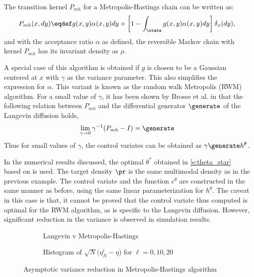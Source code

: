 The transition kernel $P_{mh}$ for a Metropolis-Hastings chain can be written as:
\begin{equation}
P_{mh}(x,dy) \eqdef g(x,y) \alpha(x,y) dy + \left [ 1 - \int_{\state} g(x,y) \alpha(x,y) dy \right] \delta_x (dy),
\label{e:kernel_mh}
\end{equation}
and with the acceptance ratio $\alpha$ as defined, the reversible Markov chain with kernel $P_{mh}$ has its invariant density as $\rho$.

A special case of this algorithm is obtained if $g$ is chosen to be a Gaussian centered at $x$ with $\gamma$ as the variance parameter. This also simplifies the expression for $\alpha$. This variant is known as the random walk Metropolis (RWM) algorithm. For a small value of $\gamma$, it has been shown by Brosse et al. in \cite{brosse} that the following relation between $P_{mh}$ and the differential generator $\generate$ of the Langevin diffusion holds,
\[
\lim_{\gamma \to 0} \gamma^{-1} (P_{mh} - I) = \generate
\]
Thus for small values of $\gamma$, the control variates can be obtained as $\gamma \generate h^\theta$.  

In the numerical results discussed, the optimal $\theta^*$ obtained in \eqref{e:theta_star} based on  is used. The target density $\pr$ is the same multimodal density as in the previous example. The control variate and the function $c^\theta$ are constructed in the same manner as before, using the same linear parameterization for $h^\theta$. The caveat in this case is that, it cannot be proved that the control variate thus computed is optimal for the RWM algorithm, as  is specific to the Langevin diffusion. However, significant reduction in the variance is observed in simulation results. %

\begin{figure}[h]
	\begin{subfigure}{0.45\textwidth}
		\caption{Langevin v Metropolis-Hastings}
		\label{lang_mh}
	\end{subfigure}
	\hfill
	\begin{subfigure}{0.45\textwidth}
		\caption{Histogram of $\sqrt{N}(\eta^{i}_N - \eta$) for $\ell=0,10,20$}
		\label{mh_all}
	\end{subfigure}
	\label{metropolis}
	\caption{Asymptotic variance reduction in Metropolis-Hastings algorithm}
\end{figure}


